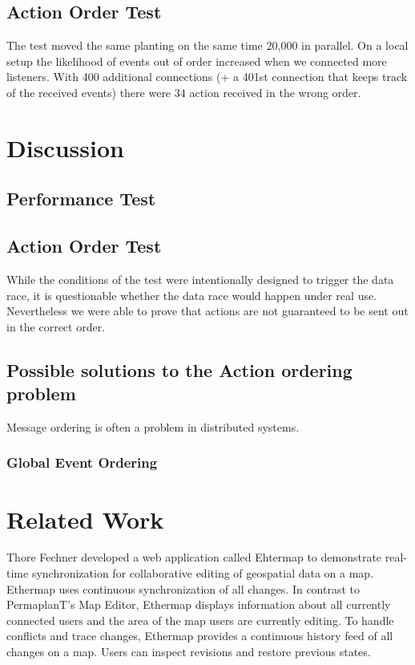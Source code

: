 \documentclass[final,oneside]{vutinfth}
\begin{document}
\section{Action Order Test}

The test moved the same planting on the same time 20,000 in parallel.
On a local setup the likelihood of events out of order increased when we connected more listeners.
With 400 additional connections (+ a 401st connection that keeps track of the received events) there were 34 action received in the wrong order.

\chapter{Discussion}

\section{Performance Test}

\section{Action Order Test}

While the conditions of the test were intentionally designed to trigger the data race, it is questionable whether the data race would happen under real use.
Nevertheless we were able to prove that actions are not guaranteed to be sent out in the correct order.

\section{Possible solutions to the Action ordering problem}

Message ordering is often a problem in distributed systems.

\subsection{Global Event Ordering}

\chapter{Related Work}

Thore Fechner developed a web application called Ehtermap to demonstrate real-time synchronization for collaborative editing of geospatial data on a map\cite{ethermap}.
Ethermap uses continuous synchronization of all changes.
In contrast to PermaplanT's Map Editor, Ethermap displays information about all currently connected users and the area of the map users are currently editing.
To handle conflicts and trace changes, Ethermap provides a continuous history feed of all changes on a map.
Users can inspect revisions and restore previous states.
\end{document}
